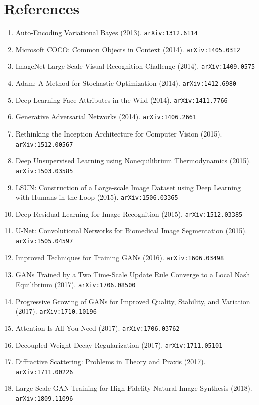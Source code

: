 \documentclass[11pt]{article}
\begin{document}
\section*{References}
\begin{enumerate}\small
  \item Auto-Encoding Variational Bayes (2013). \texttt{arXiv:1312.6114}
  \item Microsoft COCO: Common Objects in Context (2014). \texttt{arXiv:1405.0312}
  \item ImageNet Large Scale Visual Recognition Challenge (2014). \texttt{arXiv:1409.0575}
  \item Adam: A Method for Stochastic Optimization (2014). \texttt{arXiv:1412.6980}
  \item Deep Learning Face Attributes in the Wild (2014). \texttt{arXiv:1411.7766}
  \item Generative Adversarial Networks (2014). \texttt{arXiv:1406.2661}
  \item Rethinking the Inception Architecture for Computer Vision (2015). \texttt{arXiv:1512.00567}
  \item Deep Unsupervised Learning using Nonequilibrium Thermodynamics (2015). \texttt{arXiv:1503.03585}
  \item LSUN: Construction of a Large-scale Image Dataset using Deep Learning
  with Humans in the Loop (2015). \texttt{arXiv:1506.03365}
  \item Deep Residual Learning for Image Recognition (2015). \texttt{arXiv:1512.03385}
  \item U-Net: Convolutional Networks for Biomedical Image Segmentation (2015). \texttt{arXiv:1505.04597}
  \item Improved Techniques for Training GANs (2016). \texttt{arXiv:1606.03498}
  \item GANs Trained by a Two Time-Scale Update Rule Converge to a Local Nash
  Equilibrium (2017). \texttt{arXiv:1706.08500}
  \item Progressive Growing of GANs for Improved Quality, Stability, and
  Variation (2017). \texttt{arXiv:1710.10196}
  \item Attention Is All You Need (2017). \texttt{arXiv:1706.03762}
  \item Decoupled Weight Decay Regularization (2017). \texttt{arXiv:1711.05101}
  \item Diffractive Scattering: Problems in Theory and Praxis (2017). \texttt{arXiv:1711.00226}
  \item Large Scale GAN Training for High Fidelity Natural Image Synthesis (2018). \texttt{arXiv:1809.11096}

\end{enumerate}
\end{document}
